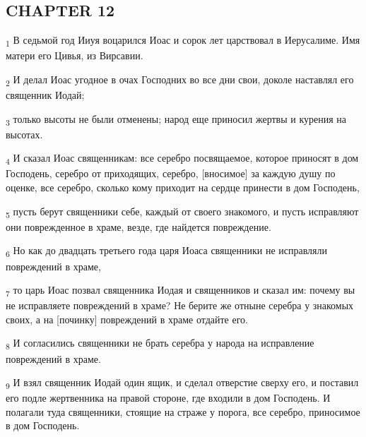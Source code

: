 \subsection{CHAPTER 12}
\begin{tcolorbox}
\textsubscript{1} В седьмой год Ииуя воцарился Иоас и сорок лет царствовал в Иерусалиме. Имя матери его Цивья, из Вирсавии.
\end{tcolorbox}
\begin{tcolorbox}
\textsubscript{2} И делал Иоас угодное в очах Господних во все дни свои, доколе наставлял его священник Иодай;
\end{tcolorbox}
\begin{tcolorbox}
\textsubscript{3} только высоты не были отменены; народ еще приносил жертвы и курения на высотах.
\end{tcolorbox}
\begin{tcolorbox}
\textsubscript{4} И сказал Иоас священникам: все серебро посвящаемое, которое приносят в дом Господень, серебро от приходящих, серебро, [вносимое] за каждую душу по оценке, все серебро, сколько кому приходит на сердце принести в дом Господень,
\end{tcolorbox}
\begin{tcolorbox}
\textsubscript{5} пусть берут священники себе, каждый от своего знакомого, и пусть исправляют они поврежденное в храме, везде, где найдется повреждение.
\end{tcolorbox}
\begin{tcolorbox}
\textsubscript{6} Но как до двадцать третьего года царя Иоаса священники не исправляли повреждений в храме,
\end{tcolorbox}
\begin{tcolorbox}
\textsubscript{7} то царь Иоас позвал священника Иодая и священников и сказал им: почему вы не исправляете повреждений в храме? Не берите же отныне серебра у знакомых своих, а на [починку] повреждений в храме отдайте его.
\end{tcolorbox}
\begin{tcolorbox}
\textsubscript{8} И согласились священники не брать серебра у народа на исправление повреждений в храме.
\end{tcolorbox}
\begin{tcolorbox}
\textsubscript{9} И взял священник Иодай один ящик, и сделал отверстие сверху его, и поставил его подле жертвенника на правой стороне, где входили в дом Господень. И полагали туда священники, стоящие на страже у порога, все серебро, приносимое в дом Господень.
\end{tcolorbox}
